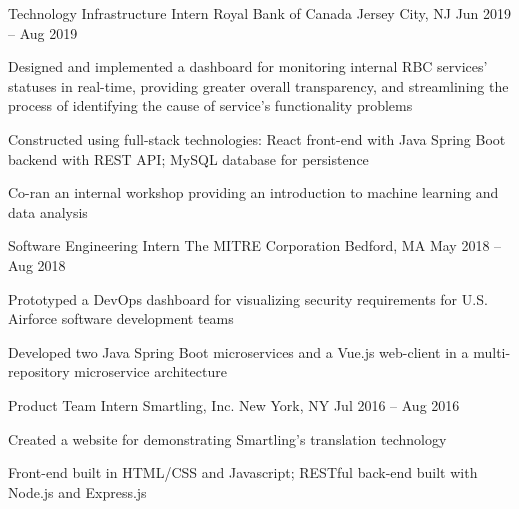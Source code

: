 

\begin{cventries}

  \cventry
  {Technology Infrastructure Intern}
  {Royal Bank of Canada}
  {Jersey City, NJ}
  {Jun 2019 -- Aug 2019}
  {
    \begin{cvitems}
      \item {Designed and implemented a dashboard for monitoring internal RBC services' statuses in real-time, providing greater overall transparency, and streamlining the process of identifying the cause of service's functionality problems}
      \item {Constructed using full-stack technologies: React front-end with Java Spring Boot backend with REST API; MySQL database for persistence}
      \item {Co-ran an internal workshop providing an introduction to machine learning and data analysis}
    \end{cvitems}
  }


  \cventry
  {Software Engineering Intern}
  {The MITRE Corporation}
  {Bedford, MA}
  {May 2018 -- Aug 2018}
  {
    \begin{cvitems}
      \item {Prototyped a DevOps dashboard for visualizing security requirements for U.S. Airforce software development teams}
      \item {Developed two Java Spring Boot microservices and a Vue.js web-client in a multi-repository microservice architecture}
    \end{cvitems}
  }


  \cventry
  {Product Team Intern}
  {Smartling, Inc.}
  {New York, NY}
  {Jul 2016 -- Aug 2016}
  {
    \begin{cvitems}
      \item Created a website for demonstrating Smartling's translation technology
      \item Front-end built in HTML/CSS and Javascript; RESTful back-end built with Node.js and Express.js 
    \end{cvitems}
  }


\end{cventries}